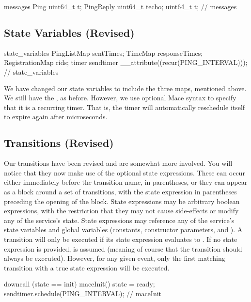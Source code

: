 \begin{programlisting}
messages {
  Ping { 
    uint64_t t;
  }
  PingReply {
    uint64_t techo;
    uint64_t t;
  }
} // messages
\end{programlisting}

\subsection{State Variables (Revised)}

\bigskip
\begin{programlisting}
state_variables {
  PingListMap sentTimes;
  TimeMap responseTimes;
  RegistrationMap rids;
  timer sendtimer __attribute((recur(PING_INTERVAL)));
} // state_variables
\end{programlisting}

We have changed our state variables to include the three maps,
mentioned above.  We still have the 
, as before.  However, we use optional Mace
syntax to specify that it is a recurring timer.  That is, the timer
will automatically reschedule itself to expire again after
 microseconds.


\subsection{Transitions (Revised)}

Our transitions have been revised and are somewhat more involved.  You will
notice that they now make use of the optional state expressions.  These can
occur either immediately before the transition name, in parentheses, or they
can appear as a block around a set of transitions, with the state expression
in parentheses preceding the opening of the block.  State expressions may be
arbitrary boolean expressions, with the restriction that they may not cause
side-effects or modify any of the service's state.  State expressions may
reference any of the service's state variables and global variables
(constants, constructor parameters, and ).  A transition
will only be executed if its state expression evaluates to .  If
no state expression is provided,  is assumed (meaning of
course that the transition should always be executed).  However, for any given
event, only the first matching transition with a true state expression will be
executed.

\begin{programlisting}
  downcall (state == init) maceInit() {
    state = ready;
    sendtimer.schedule(PING_INTERVAL);
  } // maceInit
\end{programlisting}

